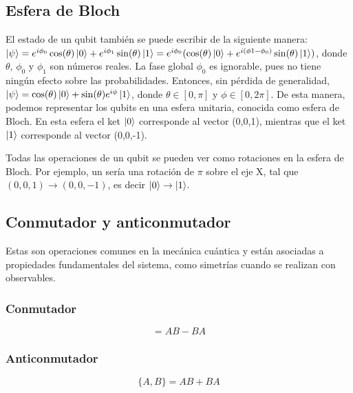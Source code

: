 \subsection{Esfera de Bloch}

El estado de un qubit también se puede escribir de la siguiente manera: $ \ket{\psi} = e^{i \phi_0} \cos ( \theta ) \ket{0} + e^{i \phi_1} \sin ( \theta ) \ket{1}  = e^{i \phi_0} (\cos ( \theta ) \ket{0} + e^{i ( \phi1 - \phi_0 )} \sin ( \theta ) \ket{1}) $, donde $ \theta $, $\phi_0$ y $\phi_1$ son números reales. La fase global $\phi_0$ es ignorable, pues no tiene ningún efecto sobre las probabilidades. Entonces, sin pérdida de generalidad, $ \ket{\psi} = \cos ( \theta ) \ket{0} + \sin ( \theta ) e^{i \phi} \ket{1} $, donde $ \theta \in [0, \pi ] $ y $ \phi \in [0, 2 \pi ] $. De esta manera, podemos representar los qubits en una esfera unitaria, conocida como esfera de Bloch. En esta esfera el ket $\ket{0}$ corresponde al vector (0,0,1), mientras que el ket $\ket{1}$ corresponde al vector (0,0,-1).

Todas las operaciones de un qubit se pueden ver como rotaciones en la esfera de Bloch. Por ejemplo, un  sería una rotación de $\pi$ sobre el eje X, tal que $(0,0,1) \rightarrow (0,0,-1)$, es decir $\ket{0} \rightarrow \ket{1}$.

\subsection{Conmutador y anticonmutador}

Estas son operaciones comunes en la mecánica cuántica y están asociadas a propiedades fundamentales del sistema, como simetrías cuando se realizan con observables.

\subsubsection{Conmutador}

\begin{equation}
    [A,B] = A B - B A
\end{equation}

\subsubsection{Anticonmutador}

\begin{equation}
    \{A,B\} = A B + B A
\end{equation}

